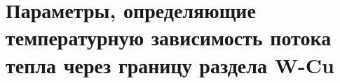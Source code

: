 \begin{comment}
            Теплота растворения,~\si{\electronvolt}                                                     & $Q_\mathrm{s}$         & \num{1.580}     \\
            Теплота хемосорбции,~\si{\electronvolt}                                                     & $|Q_\mathrm{c}|$       & \num{0.500}     \\
            Энергия активации растворения,~\si{\electronvolt}                                             & $E_\mathrm{s}$         & \num{1.960}     \\
            \bottomrule
        \end{tabularx}
    \end{threeparttable}
\end{table}
\end{comment}

\chapter{Параметры, определяющие температурную зависимость потока тепла через границу раздела W-Cu}\label{app:C}

